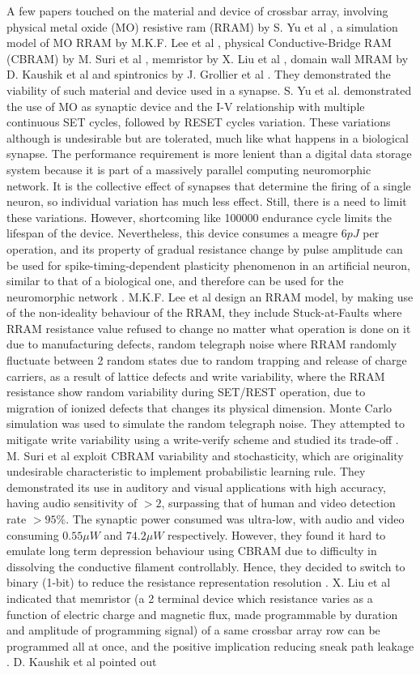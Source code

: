 A few papers touched on the material and device of crossbar array, involving physical metal oxide (MO) resistive ram (RRAM) by S. Yu et al \cite{yu}, a simulation model of MO RRAM by M.K.F. Lee et al \cite{lee}, physical Conductive-Bridge RAM (CBRAM) by M. Suri et al \cite{suri}, memristor by X. Liu et al \cite{liu}, domain wall MRAM by D. Kaushik et al \cite{kaushik} and spintronics by J. Grollier et al \cite{grollier}. They demonstrated the viability of such material and device used in a synapse. S. Yu et al. demonstrated the use of MO as synaptic device and the I-V relationship with multiple continuous SET cycles, followed by RESET cycles variation. These variations although is undesirable but are tolerated, much like what happens in a biological synapse. The performance requirement is more lenient than a digital data storage system because it is part of a massively parallel computing neuromorphic network. It is the collective effect of synapses that determine the firing of a single neuron, so individual variation has much less effect. Still, there is a need to limit these variations. However, shortcoming like 100000 endurance cycle limits the lifespan of the device. Nevertheless, this device consumes a meagre $6pJ$ per operation, and its property of gradual resistance change by pulse amplitude can be used for spike-timing-dependent plasticity phenomenon in an artificial neuron, similar to that of a biological one, and therefore can be used for the neuromorphic network \cite{yu}. M.K.F. Lee et al design an RRAM model, by making use of the non-ideality behaviour of the RRAM, they include Stuck-at-Faults where RRAM resistance value refused to change no matter what operation is done on it due to manufacturing defects, random telegraph noise where RRAM randomly fluctuate between 2 random states due to random trapping and release of charge carriers, as a result of lattice defects and write variability, where the RRAM resistance show random variability during SET/REST operation, due to migration of ionized defects that changes its physical dimension. Monte Carlo simulation was used to simulate the random telegraph noise. They attempted to mitigate write variability using a write-verify scheme and studied its trade-off \cite{lee}. M. Suri et al exploit CBRAM variability and stochasticity, which are originality undesirable characteristic to implement probabilistic learning rule. They demonstrated its use in auditory and visual applications with high accuracy, having audio sensitivity of $>2$, surpassing that of human and video detection rate $> 95\%$. The synaptic power consumed was ultra-low, with audio and video consuming $0.55\mu W$ and $74.2\mu W$ respectively. However, they found it hard to emulate long term depression behaviour using CBRAM due to difficulty in dissolving the conductive filament controllably. Hence, they decided to switch to binary (1-bit) to reduce the resistance representation resolution \cite{suri}. X. Liu et al indicated that memristor (a 2 terminal device which resistance varies as a function of electric charge and magnetic flux, made programmable by duration and amplitude of programming signal) of a same crossbar array row can be programmed all at once, and the positive implication reducing sneak path leakage \cite{liu}. D. Kaushik et al pointed out 